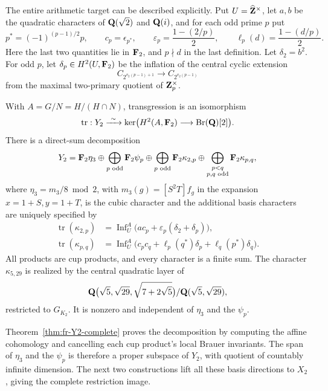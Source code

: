 The entire arithmetic target can be described explicitly. Put
\(U=\widehat{\mathbf Z}^\times\), let \(a,b\) be the quadratic characters of
\(\mathbf Q(\sqrt2)\) and \(\mathbf Q(i)\), and for each odd prime \(p\) put
\[
 p^*=(-1)^{(p-1)/2}p,\qquad
 c_p=\epsilon_{p^*},\qquad
 \varepsilon_p=\frac{1-(2/p)}2,\qquad
 \ell_p(d)=\frac{1-(d/p)}2.
\]
Here the last two quantities lie in \(\mathbf F_2\), and \(p\nmid d\)
in the last definition. Let \(\delta_2=b^2\). For odd \(p\),
let \(\delta_p\in H^2(U,\mathbf F_2)\) be the inflation of the central
cyclic extension
\[
 C_{2^{v_2(p-1)+1}}\longrightarrow C_{2^{v_2(p-1)}}
\]
from the maximal two-primary quotient of \(\mathbf Z_p^\times\).

\begin{theorem}\label{thm:main-full-quadratic-target}
With \(A=G/N=H/(H\cap N)\), transgression is an isomorphism
\[
 \operatorname{tr}:Y_2\xrightarrow{\ \sim\ }
 \ker\bigl(H^2(A,\mathbf F_2)\longrightarrow\operatorname{Br}(\mathbf Q)[2]\bigr).
\]
There is a direct-sum decomposition
\[
 Y_2=\mathbf F_2\eta_3
 \oplus\bigoplus_{p\text{ odd}}\mathbf F_2\psi_p
 \oplus\bigoplus_{p\text{ odd}}\mathbf F_2\kappa_{2,p}
 \oplus\bigoplus_{\substack{p<q\\p,q\text{ odd}}}\mathbf F_2\kappa_{p,q},
\]
where \(\eta_3=m_3/8\bmod2\), with
\(m_3(g)=[S^2T]f_g\) in the expansion \(x=1+S,y=1+T\),
is the cubic character and
the additional basis characters are uniquely specified by
\begin{align*}
 \operatorname{tr}(\kappa_{2,p})
 &=\operatorname{Inf}_U^A
       \bigl(ac_p+\varepsilon_p(\delta_2+\delta_p)\bigr),\\
 \operatorname{tr}(\kappa_{p,q})
 &=\operatorname{Inf}_U^A
       \bigl(c_pc_q+\ell_p(q^*)\delta_p+\ell_q(p^*)\delta_q\bigr).
\end{align*}
All products are cup products, and every character is a finite sum.
The character \(\kappa_{5,29}\) is realized by the central quadratic
layer of
\[
 \mathbf Q\bigl(\sqrt5,\sqrt{29},\sqrt{7+2\sqrt5}\bigr)
       /\mathbf Q(\sqrt5,\sqrt{29}),
\]
restricted to \(G_{K_2}\). It is nonzero and independent of
\(\eta_3\) and the \(\psi_p\).
\end{theorem}

Theorem~\ref{thm:fr-Y2-complete} proves the decomposition by
computing the affine cohomology and cancelling each cup product's
local Brauer invariants. The span of \(\eta_3\) and the
\(\psi_p\) is therefore a proper subspace of \(Y_2\), with quotient
of countably infinite dimension. The next two constructions lift all these basis directions to
\(X_2\), giving the complete restriction image.

